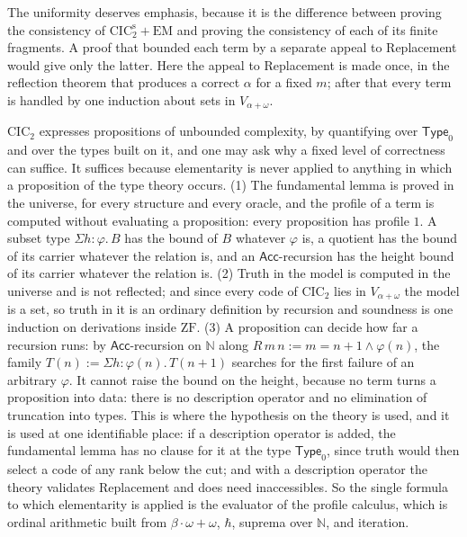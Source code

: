 \documentclass[10pt]{article}
\newcommand{\N}{\mathbb{N}}
\newcommand{\Type}{\mathsf{Type}}
\newcommand{\CIC}{\mathrm{CIC}}
\newcommand{\ZF}{\mathrm{ZF}}
\newcommand{\EM}{\mathrm{EM}}
\newcommand{\Acc}{\mathsf{Acc}}
\begin{document}
The uniformity deserves emphasis, because it is the difference between
proving the consistency of $\CIC_2^{\mathrm s}+\EM$ and proving the
consistency of each of its finite fragments. A proof that bounded each
term by a separate appeal to Replacement would give only the latter.
Here the appeal to Replacement is made once, in the reflection theorem
that produces a correct $\alpha$ for a fixed $m$; after that every term is
handled by one induction about sets in $V_{\alpha+\omega}$.

\begin{remark}\label{rem:complexity}
$\CIC_2$ expresses propositions of unbounded complexity, by quantifying
over $\Type_0$ and over the types built on it, and one may ask why a
fixed level of correctness can suffice. It suffices because elementarity
is never applied to anything in which a proposition of the type theory
occurs. (1) The fundamental lemma is proved in the universe, for every
structure and every oracle, and the profile of a term is computed without
evaluating a proposition: every proposition has profile $1$. A subset
type $\Sigma h{:}\varphi.\,B$ has the bound of $B$ whatever $\varphi$ is, a
quotient has the bound of its carrier whatever the relation is, and an
$\Acc$-recursion has the height bound of its carrier whatever the
relation is. (2) Truth in the model is computed in the universe and is
not reflected; and since every code of $\CIC_2$ lies in $V_{\alpha+\omega}$
the model is a set, so truth in it is an ordinary definition by recursion
and soundness is one induction on derivations inside $\ZF$. (3) A
proposition can decide how far a recursion runs: by $\Acc$-recursion on
$\N$ along $R\,m\,n:=m=n+1\wedge\varphi(n)$, the family
$T(n):=\Sigma h{:}\varphi(n).\,T(n+1)$ searches for the first failure of an
arbitrary $\varphi$. It cannot raise the bound on the height, because no term
turns a proposition into data: there is no description operator and no
elimination of truncation into types. This is where the hypothesis on
the theory is used, and it is used at one identifiable place: if a
description operator is added, the fundamental lemma has no clause for
it at the type $\Type_0$, since truth would then select a code of any
rank below the cut; and with a description operator the theory validates
Replacement and does need inaccessibles. So the single formula to which
elementarity is applied is the evaluator of the profile calculus, which
is ordinal arithmetic built from $\beta\cdot\omega+\omega$, $\hbar$, suprema over
$\N$, and iteration.


\end{remark}
\end{document}

